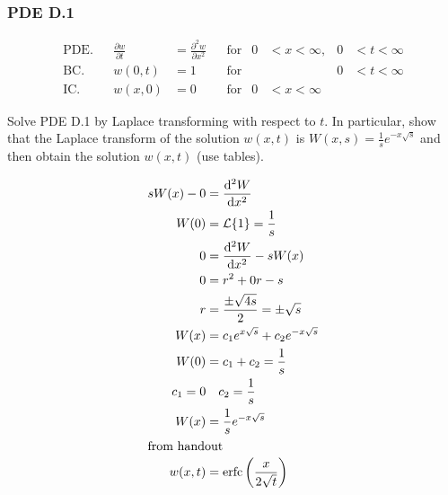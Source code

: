 \documentclass{article}
\begin{document}
\subsubsection*{PDE D.1}
\begin{align*}
  \text{PDE.}&&\frac{\partial w}{\partial t}&=\frac{\partial^2w}{\partial x^2}&&\text{for}&0&<x<\infty,&0&<t<\infty\\
  \text{BC.}&&w(0,t)&=1&&\text{for}&&&0&<t<\infty\\
  \text{IC.}&&w(x,0)&=0&&\text{for}&0&<x<\infty
\end{align*}

Solve PDE D.1 by Laplace transforming with respect to $t$. In particular, show that the Laplace transform of the solution $w(x,t)$ is $W(x,s)=\frac{1}{s}e^{-x\sqrt{s}}$ and then obtain the solution $w(x,t)$ (use tables).

\begin{align*}
  sW(x)-0&=\frac{\mathrm{d}^2W}{\mathrm{d}x^2}\\
  W(0)&=\mathcal{L}\{1\}=\frac{1}{s}\\
  0&=\frac{\mathrm{d}^2W}{\mathrm{d}x^2}-sW(x)\\
  0&=r^2+0r-s\\
  r&=\frac{\pm\sqrt{4s}}{2}=\pm\sqrt{s}\\
  W(x)&=c_1e^{x\sqrt{s}}+c_2e^{-x\sqrt{s}}\\
  W(0)&=c_1+c_2=\frac{1}{s}\\
  c_1=0&\quad c_2=\frac{1}{s}\\
  W(x)&=\frac{1}{s}e^{-x\sqrt{s}}\\
  \intertext{from handout}
  w(x,t)&=\text{erfc}\left(\frac{x}{2\sqrt{t}}\right)
\end{align*}
\end{document}
